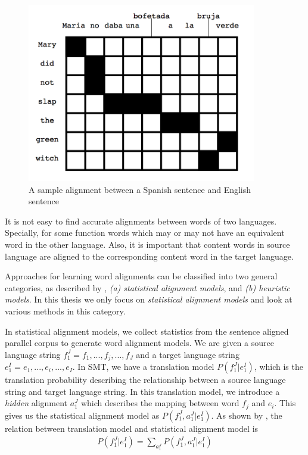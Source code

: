 \begin{figure}[h]
\includegraphics[width=10cm]{files/images/alignmentExample}
\centering
\caption{A sample alignment between a Spanish sentence and English sentence \cite{Koehn2009}}
\label{fig:sample-align}
\end{figure}

It is not easy to find accurate alignments between words of two languages. Specially, for some function words which may or may not have an equivalent word in the other language. Also, it is important that content words in source language are aligned to the corresponding content word in the target language.

Approaches for learning word alignments can be classified into two general categories, as described by \cite{Och2003}, \textit{(a) statistical alignment models}, and \textit{(b) heuristic models}. In this thesis we only focus on \textit{statistical alignment models} and look at various methods in this category. 

In statistical alignment models, we collect statistics from the sentence aligned parallel corpus to generate word alignment models. We are given a source language string $f^J_1 = f_1,..., f_j, ..., f_J$ and a target language string $e^I_1 = e_1, ..., e_i, ..., e_I$. In SMT, we have a translation model $P(f^J_1 | e^I_1)$, which is the translation probability describing the relationship between a source language string and target language string. In this translation model, we introduce a \textit{hidden} alignment $a^J_1$ which describes the mapping between word $f_j$ and $e_i$. This gives us the statistical alignment model as $P(f^J_1, a^J_1 | e^I_1)$. As shown by \cite{Och2003}, the relation between translation model and statistical alignment model is
\begin{eqnarray}
P(f^J_1 | e^I_1) = \sum_{a^J_1} P(f^J_1, a^J_1 | e^I_1)
\end{eqnarray}

